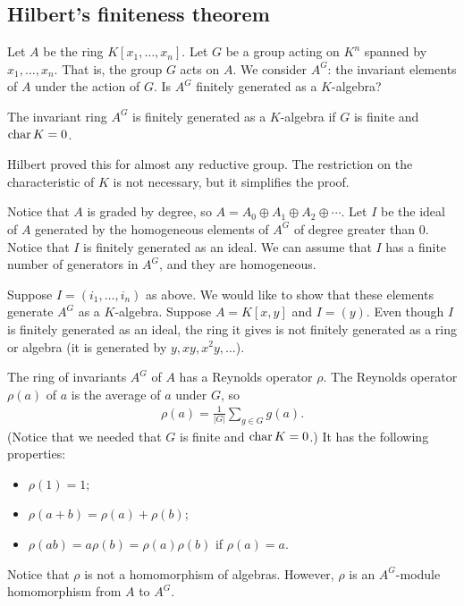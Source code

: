 \documentclass [11 pt, oneside, margin = 1 in] {article}
\begin{document}
\subsection{Hilbert's finiteness theorem}
Let $A$ be the ring $K[x_1,\hdots, x_n]$. Let $G$ be a group acting on $K^n$ spanned by $x_1,\hdots, x_n$. That is, the group $G$ acts on $A$. We consider $A^G$: the invariant elements of $A$ under the action of $G$. Is $A^G$ finitely generated as a $K$-algebra?

\begin{theorem}[Hilbert]\label{}\text{}
The invariant ring $A^G$ is finitely generated as a $K$-algebra if $G$ is finite and $\operatorname{char} K = 0$.
\end{theorem}
\begin{remark}
	Hilbert proved this for almost any reductive group. The restriction on the characteristic of $K$ is not necessary, but it simplifies the proof.
\end{remark}

Notice that $A$ is graded by degree, so $A = A_0\oplus A_1\oplus A_2\oplus \cdots$. Let $I$ be the ideal of $A$ generated by the homogeneous elements of $A^G$ of degree greater than $0$. Notice that $I$ is finitely generated as an ideal. We can assume that $I$ has a finite number of generators in $A^G$, and they are homogeneous. 

Suppose $I=(i_1,\hdots,i_n)$ as above. We would like to show that these elements generate $A^G$ as a $K$-algebra. Suppose $A=K[x,y]$ and $I = (y)$. Even though $I$ is finitely generated as an ideal, the ring it gives is not finitely generated as a ring or algebra (it is generated by $y, xy, x^2y,\hdots$). 

The ring of invariants $A^G$ of $A$ has a Reynolds operator $\rho$. The Reynolds operator $\rho(a)$ of $a$ is the average of $a$ under $G$, so
\begin{align*}
	\rho(a) = \frac{1}{\left\lvert G \right\rvert } \sum_{g\in G}^{} g(a).
\end{align*}
(Notice that we needed that $G$ is finite and $\operatorname{char} K = 0$.) It has the following properties:
\begin{itemize}
	\item $\rho(1)=1$;
	\item $\rho(a+b) = \rho (a)+\rho (b)$;
	\item $\rho(ab) = a\rho (b)=\rho(a)\rho (b)$ if $\rho(a)=a$.
\end{itemize}
Notice that $\rho$ is not a homomorphism of algebras. However, $\rho$ is an $A^G$-module homomorphism from $A$ to $A^G$.
\end{document}
